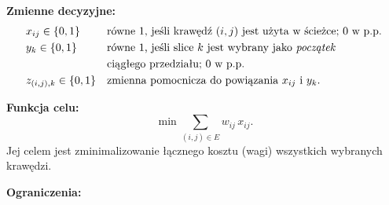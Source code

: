 \documentclass[12pt]{article}
\begin{document}
\noindent \textbf{Zmienne decyzyjne:}
\begin{align*}
	 & x_{ij} \in \{0,1\}
	 &                         & \text{równe }1\text{, jeśli krawędź }(i,j)\text{ jest użyta w ścieżce; }0\text{ w p.p.}                                               \\
	 & y_{k} \in \{0,1\}
	 &                         & \text{równe }1\text{, jeśli slice }k \text{ jest wybrany jako \emph{początek} }                                                     \\
	 &                         &                                                                                         & \text{ciągłego przedziału; }0\text{ w p.p.} \\
	 & z_{(i,j),k} \in \{0,1\}
	 &                         & \text{zmienna pomocnicza do powiązania }x_{ij} \text{ i } y_k.
\end{align*}

\vspace{2em}

\noindent \textbf{Funkcja celu:}
\[
	\min \sum_{(i,j)\in E} w_{ij} \, x_{ij}.
\]
Jej celem jest zminimalizowanie łącznego kosztu (wagi) wszystkich wybranych krawędzi.

\vspace{2em}

\noindent \textbf{Ograniczenia:}
\end{document}
